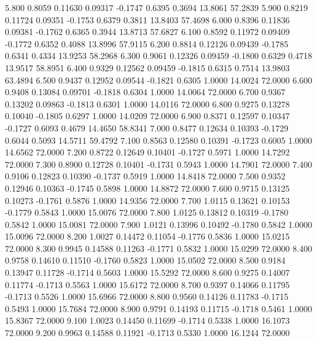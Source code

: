    5.800   0.8059   0.11630   0.09317  -0.1747   0.6395   0.3694  13.8061  57.2839
   5.900   0.8219   0.11724   0.09351  -0.1753   0.6379   0.3811  13.8403  57.4698
   6.000   0.8396   0.11836   0.09381  -0.1762   0.6365   0.3944  13.8713  57.6827
   6.100   0.8592   0.11972   0.09409  -0.1772   0.6352   0.4088  13.8996  57.9115
   6.200   0.8814   0.12126   0.09439  -0.1785   0.6341   0.4334  13.9253  58.2968
   6.300   0.9061   0.12326   0.09459  -0.1800   0.6329   0.4718  13.9517  58.8951
   6.400   0.9329   0.12562   0.09459  -0.1815   0.6315   0.7514  13.9803  63.4894
   6.500   0.9437   0.12952   0.09544  -0.1821   0.6305   1.0000  14.0024  72.0000
   6.600   0.9408   0.13084   0.09701  -0.1818   0.6304   1.0000  14.0064  72.0000
   6.700   0.9367   0.13202   0.09863  -0.1813   0.6301   1.0000  14.0116  72.0000
   6.800   0.9275   0.13278   0.10040  -0.1805   0.6297   1.0000  14.0209  72.0000
   6.900   0.8371   0.12597   0.10347  -0.1727   0.6093   0.4679  14.4650  58.8341
   7.000   0.8477   0.12634   0.10393  -0.1729   0.6044   0.5093  14.5711  59.4792
   7.100   0.8563   0.12580   0.10391  -0.1723   0.6005   1.0000  14.6562  72.0000
   7.200   0.8722   0.12649   0.10401  -0.1727   0.5971   1.0000  14.7292  72.0000
   7.300   0.8900   0.12728   0.10401  -0.1731   0.5943   1.0000  14.7901  72.0000
   7.400   0.9106   0.12823   0.10390  -0.1737   0.5919   1.0000  14.8418  72.0000
   7.500   0.9352   0.12946   0.10363  -0.1745   0.5898   1.0000  14.8872  72.0000
   7.600   0.9715   0.13125   0.10273  -0.1761   0.5876   1.0000  14.9356  72.0000
   7.700   1.0115   0.13621   0.10153  -0.1779   0.5843   1.0000  15.0076  72.0000
   7.800   1.0125   0.13812   0.10319  -0.1780   0.5842   1.0000  15.0081  72.0000
   7.900   1.0121   0.13996   0.10492  -0.1780   0.5842   1.0000  15.0096  72.0000
   8.200   1.0027   0.14472   0.11054  -0.1776   0.5836   1.0000  15.0215  72.0000
   8.300   0.9945   0.14588   0.11263  -0.1771   0.5832   1.0000  15.0299  72.0000
   8.400   0.9758   0.14610   0.11510  -0.1760   0.5823   1.0000  15.0502  72.0000
   8.500   0.9184   0.13947   0.11728  -0.1714   0.5603   1.0000  15.5292  72.0000
   8.600   0.9275   0.14007   0.11774  -0.1713   0.5563   1.0000  15.6172  72.0000
   8.700   0.9397   0.14066   0.11795  -0.1713   0.5526   1.0000  15.6966  72.0000
   8.800   0.9560   0.14126   0.11783  -0.1715   0.5493   1.0000  15.7684  72.0000
   8.900   0.9791   0.14193   0.11715  -0.1718   0.5461   1.0000  15.8367  72.0000
   9.100   1.0023   0.14450   0.11699  -0.1714   0.5338   1.0000  16.1073  72.0000
   9.200   0.9963   0.14588   0.11921  -0.1713   0.5330   1.0000  16.1244  72.0000
